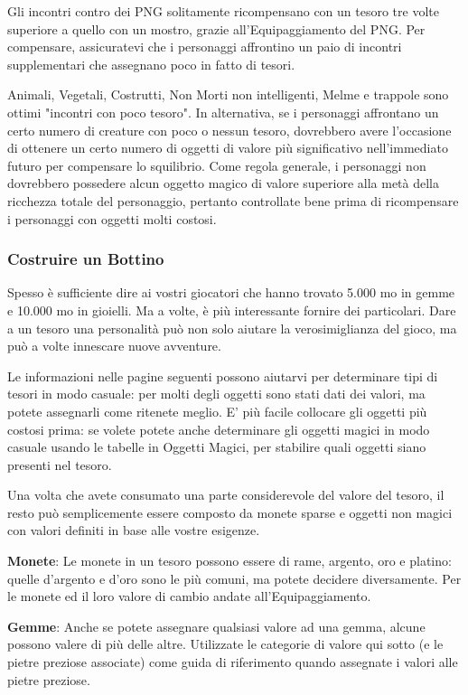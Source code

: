 \documentclass[a4paper,11pt,twoside,openany]{book}
\begin{document}
\bigskip

Gli incontri contro dei PNG solitamente ricompensano con un tesoro
tre volte superiore a quello con un mostro, grazie all'Equipaggiamento
del PNG. Per compensare, assicuratevi che i personaggi affrontino
un paio di incontri supplementari che assegnano poco in fatto di tesori.

Animali, Vegetali, Costrutti, Non Morti non intelligenti, Melme e trappole sono ottimi "incontri con poco tesoro". In alternativa, se i personaggi affrontano un certo numero di creature con poco o nessun tesoro, dovrebbero avere l'occasione di ottenere un certo numero di oggetti di valore più significativo nell'immediato futuro per compensare lo squilibrio. Come regola generale, i personaggi non dovrebbero possedere alcun oggetto magico di valore superiore alla metà della ricchezza totale del personaggio, pertanto controllate bene prima di ricompensare i personaggi con oggetti molti costosi.

\subsubsection{Costruire un Bottino}

Spesso è sufficiente dire ai vostri giocatori che hanno trovato 5.000
mo in gemme e 10.000 mo in gioielli. Ma a volte, è più interessante
fornire dei particolari. Dare a un tesoro una personalità può non
solo aiutare la verosimiglianza del gioco, ma può a volte innescare
nuove avventure.

Le informazioni nelle pagine seguenti possono aiutarvi per determinare tipi di tesori in modo casuale: per molti degli oggetti sono stati dati dei valori, ma potete assegnarli come ritenete meglio. E' più facile collocare gli oggetti più costosi prima: se volete potete anche determinare gli oggetti magici in modo casuale usando le tabelle in Oggetti Magici, per stabilire quali oggetti siano presenti nel tesoro.

Una volta che avete consumato una parte considerevole del valore del tesoro, il resto può semplicemente essere composto da monete sparse e oggetti non magici con valori definiti in base alle vostre esigenze.

\textbf{Monete}: Le monete in un tesoro possono essere di rame, argento, oro e platino: quelle d'argento e d'oro sono le più comuni, ma potete decidere diversamente. Per le monete ed il loro valore di cambio andate all'Equipaggiamento.

\textbf{Gemme}: Anche se potete assegnare qualsiasi valore ad una gemma, alcune possono valere di più delle altre. Utilizzate le categorie di valore qui sotto (e le pietre preziose associate) come guida di riferimento quando assegnate i valori alle pietre preziose.
\end{document}
